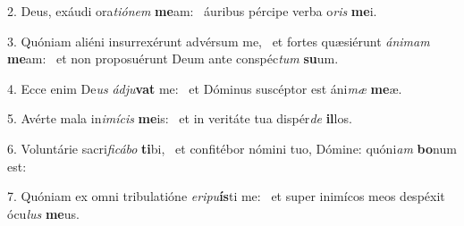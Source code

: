 2. Deus, exáudi ora\textit{ti}\textit{ó}\textit{nem} \textbf{me}am: \ast\  áuribus pércipe verba o\textit{ris} \textbf{me}i.\

3. Quóniam aliéni insurrexérunt advérsum me, \dag\  et fortes quæsiérunt \textit{á}\textit{ni}\textit{mam} \textbf{me}am: \ast\  et non proposuérunt Deum ante conspéc\textit{tum} \textbf{su}um.\

4. Ecce enim De\textit{us} \textit{ád}\textit{ju}\textbf{vat} me: \ast\  et Dóminus suscéptor est áni\textit{mæ} \textbf{me}æ.\

5. Avérte mala in\textit{i}\textit{mí}\textit{cis} \textbf{me}is: \ast\  et in veritáte tua dispér\textit{de} \textbf{il}los.\

6. Voluntárie sacri\textit{fi}\textit{cá}\textit{bo} \textbf{ti}bi, \ast\  et confitébor nómini tuo, Dómine: quóni\textit{am} \textbf{bo}num est:\

7. Quóniam ex omni tribulatióne \textit{e}\textit{ri}\textit{pu}\textbf{ís}ti me: \ast\  et super inimícos meos despéxit ócu\textit{lus} \textbf{me}us.\

